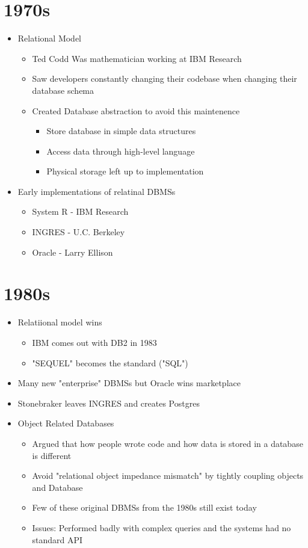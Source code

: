 \documentclass[11pt]{article}
\begin{document}
\section{1970s}
\begin{itemize}
    \item Relational Model
    \begin{itemize}
        \item Ted Codd Was mathematician working at IBM Research
        \item Saw developers constantly changing their codebase when changing their database schema
        \item Created Database abstraction to avoid this maintenence
        \begin{itemize}
            \item Store database in simple data structures
            \item Access data through high-level language
            \item Physical storage left up to implementation
        \end{itemize}
    \end{itemize}
    \item Early implementations of relatinal DBMSs
    \begin{itemize}
        \item System R - IBM Research
        \item INGRES - U.C. Berkeley
        \item Oracle - Larry Ellison
    \end{itemize}
\end{itemize}

\section{1980s}
\begin{itemize}
    \item Relatiional model wins
    \begin{itemize}
        \item IBM comes out with DB2 in 1983
        \item "SEQUEL" becomes the standard ("SQL")
    \end{itemize}
    \item Many new "enterprise" DBMSs but Oracle wins marketplace
    \item Stonebraker leaves INGRES and creates Postgres
    \item Object Related Databases
    \begin{itemize}
        \item Argued that how people wrote code and how data is stored in a database is different
        \item Avoid "relational object impedance mismatch" by tightly coupling objects and Database
        \item Few of these original DBMSs from the 1980s still exist today
        \item Issues: Performed badly with complex queries and the systems had no standard API
    \end{itemize}
\end{itemize}
\end{document}
